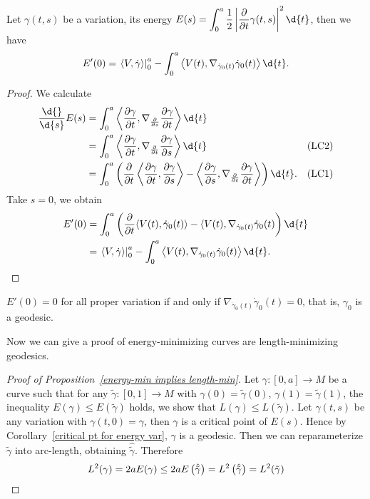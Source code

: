 \begin{prop}
    Let $\gamma(t,s)$ be a variation, its energy $\displaystyle E(s)=\int_0^a\frac{1}{2}\left|\frac{\partial{}}{\partial{t}}\gamma(t,s)\right|^2\d{t}$, then we have
    \[E'(0)=\left.\langle V,\dot{\gamma}\rangle\right|^a_0-\int_0^a\left\langle V(t),\nabla_{\dot{\gamma}_0(t)}\dot{\gamma}_0(t)\right\rangle\d{t}.\]
\end{prop}
\begin{proof}
    We calculate
    \begin{align*}
        \frac{\d{}}{\d{s}}E(s)&=\int_0^a\left\langle\frac{\partial{\gamma}}{\partial{t}},\nabla_{\frac{\partial{}}{\partial{s}}}\frac{\partial{\gamma}}{\partial{t}}\right\rangle\d{t} &\\
        &=\int_0^a\left\langle\frac{\partial{\gamma}}{\partial{t}},\nabla_{\frac{\partial{}}{\partial{t}}}\frac{\partial{\gamma}}{\partial{s}}\right\rangle\d{t} &\text{(LC2)}\\
        &=\int_0^a\left(\frac{\partial}{\partial{t}}\left\langle\frac{\partial{\gamma}}{\partial{t}},\frac{\partial{\gamma}}{\partial{s}}\right\rangle-\left\langle\frac{\partial{\gamma}}{\partial{s}},\nabla_{\frac{\partial{}}{\partial{t}}}\frac{\partial{\gamma}}{\partial{t}}\right\rangle\right)\d{t}. &\text{(LC1)}
    \end{align*}
    Take $s=0$, we obtain
    \begin{align*}
        E'(0)&=\int_0^a\left(\frac{\partial{}}{\partial{t}}\langle V(t),\dot{\gamma}_0(t)\rangle-\langle V(t),\nabla_{\dot{\gamma}_0(t)}\dot{\gamma}_0(t)\right)\d{t}\\
        &=\left.\langle V,\dot{\gamma}\rangle\right|^a_0-\int_0^a\left\langle V(t),\nabla_{\dot{\gamma}_0(t)}\dot{\gamma}_0(t)\right\rangle\d{t}.\qedhere
    \end{align*}
\end{proof}

\begin{cor}\label{critical pt for energy var}
    $E'(0)=0$ for all proper variation if and only if $\nabla_{\dot{\gamma}_0(t)}\dot{\gamma}_0(t)=0$, that is, $\gamma_0$ is a geodesic.
\end{cor}

Now we can give a proof of energy-minimizing curves are length-minimizing geode\-sics.
\begin{proof}[Proof of Proposition~\ref{energy-min implies length-min}]
    Let $\gamma:[0,a]\to M$ be a curve such that for any $\tilde{\gamma}:[0,1]\to M$ with $\gamma(0)=\tilde{\gamma}(0)$, $\gamma(1)=\tilde{\gamma}(1)$, the inequality $E(\gamma)\leq E(\tilde{\gamma})$ holds, we show that $L(\gamma)\leq L(\tilde{\gamma})$.
    Let $\gamma(t,s)$ be any variation with $\gamma(t,0)=\gamma$, then $\gamma$ is a critical point of $E(s)$.
    Hence by Corollary~\ref{critical pt for energy var}, $\gamma$ is a geodesic.
    Then we can reparameterize $\tilde{\gamma}$ into arc-length, obtaining $\hat{\tilde{\gamma}}$.
    Therefore
    \[L^2(\gamma)=2aE(\gamma)\leq 2aE\left(\hat{\tilde{\gamma}}\right)=L^2\left(\hat{\tilde{\gamma}}\right)=L^2(\tilde{\gamma})\qedhere\]
\end{proof}

